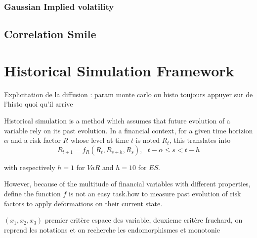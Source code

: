 \documentclass[3pt]{article}
\begin{document}
\subsubsection{Gaussian Implied volatility}

\bigskip

\subsection{Correlation Smile}

\bigskip

\bigskip

\bigskip

\bigskip

\bigskip

\bigskip

\bigskip

\bigskip

\bigskip

\bigskip

\bigskip

\bigskip

\section{Historical Simulation Framework}

\bigskip 

Explicitation de la diffusion : param monte carlo ou histo toujours appuyer
sur de l'histo quoi qu'il arrive\bigskip 

\bigskip 

\bigskip 

Historical simulation is a method which assumes that future evolution of a
variable rely on its past evolution. In a financial context, for a given
time horizion $\alpha $ and a risk factor $R$ whose level at time $t$ is
noted $R_{t}$, this translates into 
\begin{equation*}
R_{t+1}=f_{R}(R_{t},R_{s+h},R_{s}),\text{ \ \ }t-\alpha \leq s<t-h
\end{equation*}

with respectively $h=1$ for $VaR$ and $h=10$ for $ES$.

\bigskip

However, because of the multitude of financial variables with different
properties, define the function $f$ is not an easy task.how to measure past
evolution of risk factors to apply deformations on their current state.

\bigskip $(x_{1},x_{2},x_{3})$ premier crit\`{e}re espace des variable,
deuxieme crit\`{e}re fruchard, on reprend les notations et on recherche les
endomorphismes et monotonie
\end{document}
